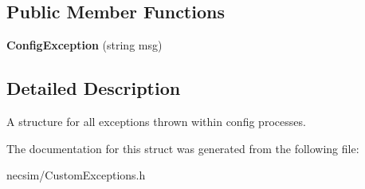\subsection*{Public Member Functions}
\begin{DoxyCompactItemize}
\item 
{\bfseries Config\+Exception} (string msg)\hypertarget{struct_config_exception_ab480162a6c4fa7932b4d6906025172f1}{}\label{struct_config_exception_ab480162a6c4fa7932b4d6906025172f1}

\end{DoxyCompactItemize}


\subsection{Detailed Description}
A structure for all exceptions thrown within config processes. 

The documentation for this struct was generated from the following file\+:\begin{DoxyCompactItemize}
\item 
necsim/Custom\+Exceptions.\+h\end{DoxyCompactItemize}
